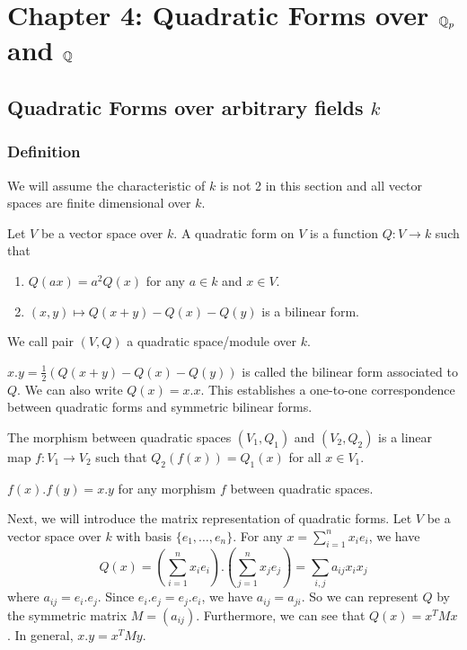\documentclass[15pt]{scrartcl}
\begin{document}
\section{Chapter 4: Quadratic Forms over $\mathbb Q_p$ and $\mathbb Q$}
\subsection{Quadratic Forms over arbitrary fields $k$}
\subsubsection*{Definition}
We will assume the characteristic of $k$ is not 2 in this section and all vector spaces are finite dimensional over $k$.
\begin{definition}
    Let $V$ be a vector space over $k$. A quadratic form on $V$ is a function $Q: V\to k$ such that
    \begin{enumerate}
        \item $Q(ax)=a^2Q(x)$ for any $a\in k$ and $x\in V$.
        \item $(x,y)\mapsto Q(x+y)-Q(x)-Q(y)$ is a bilinear form. 
    \end{enumerate}
    We call pair $(V,Q)$ a quadratic space/module over $k$.
\end{definition}
\begin{definition}
    $x.y=\frac{1}{2}(Q(x+y)-Q(x)-Q(y))$ is called the bilinear form associated to $Q$. We can also write $Q(x)=x.x$. This establishes a one-to-one correspondence between quadratic forms and symmetric bilinear forms.
\end{definition}
\begin{definition}
    The morphism between quadratic spaces $(V_1,Q_1)$ and $(V_2,Q_2)$ is a linear map $f: V_1\to V_2$ such that $Q_2(f(x))=Q_1(x)$ for all $x\in V_1$.
\end{definition}
\begin{corollary}
    $f(x).f(y)=x.y$ for any morphism $f$ between quadratic spaces. 
\end{corollary}
Next, we will introduce the matrix representation of quadratic forms. Let $V$ be a vector space over $k$ with basis $\{e_1,\ldots,e_n\}$. For any $x=\sum_{i=1}^n x_ie_i$, we have
\[Q(x)=(\sum_{i=1}^n x_ie_i).(\sum_{j=1}^n x_je_j)=\sum_{i,j} a_{ij}x_ix_j\] where $a_{ij}=e_i.e_j$. Since $e_i.e_j=e_j.e_i$, we have $a_{ij}=a_{ji}$. So we can represent $Q$ by the symmetric matrix $M=(a_{ij})$. Furthermore, we can see that $Q(x)=x^TMx$. In general, $x.y=x^TM y$. 
\\
\end{document}
